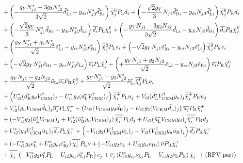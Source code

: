 \documentclass[CheatSheet]{subfiles}
\begin{document}
\begin{align}
\notag\\&+ \left(-\frac{g_Y N_{j1}^*-3g_2 N_{j2}^*}{3\sqrt{2}}\tdL[i]^{*}-\yd[i]N_{j3}^*\tdR[i]^{*}\right){\overline{\neut[j]}\PL d_i}
   +  \left(-\frac{ \sqrt2g_Y}{3} N_{j1} \tdR[i]^*-\yd[i]N_{j3}\tdL[i]^* \right){\overline{\neut[j]}\PR d_i}
\notag\\&+ \left(-\frac{ \sqrt2g_Y}{3} N_{j1}^* \tdR[i]-\yd[i]N_{j3}^*\tdL[i] \right){\overline{d_i}\PL \neut[j]}
   + \left(-\frac{g_Y N_{j1}-3g_2 N_{j2}}{3\sqrt{2}}\tdL[i]-\yd[i]N_{j3}\tdR[i]\right){\overline{d_i}\PR \neut[j]}
\notag\\&+ \left(\frac{g_Y N_{j1}^*+ g_2 N_{j2}^*}{ \sqrt{2}}\teL[i]^{*}-\ye[i]N_{j3}^*\teR[i]^{*}\right){\overline{\neut[j]}\PL e_i}
   +  \left(-\sqrt{2}       g_Y   N_{j1} \teR[i]^*-\ye[i]N_{j3}\teL[i]^* \right){\overline{\neut[j]}\PR e_i}
\notag\\&+ \left(-\sqrt{2}       g_Y   N_{j1}^*\teR[i]-\ye[i]N_{j3}^*\teL[i] \right){\overline{e_i}\PL \neut[j]}
   +  \left(+\frac{g_Y N_{j1}+ g_2 N_{j2}}{ \sqrt{2}}\teL[i]-\ye[i]N_{j3}\teR[i]\right){\overline{e_i}\PR\neut[j]}
\notag\\&+ \frac{g_Y N_{j1}  -g_2 N_{j2}}  {\sqrt{2}}\tnuL[i]\overline{\nu_i}\PR\neut[j]
   +  \frac{g_Y N_{j1}^*-g_2 N_{j2}^*}{\sqrt{2}}\tnuL[i]^{*}{\overline{\neut[j]}\PL \nu_i}
\notag\\&+ \left(U_{i2}^* (\tdR^{*}\yd V\w{CKM}^\dagger)_j - U_{i1}^* g_2 (\tdL^{*}V\w{CKM}^\dagger)_j \right)\overline{\charP[i]}\PL u_j
   + V_{i2} (\tdL^*V\w{CKM}^\dagger\yu)_j  \overline{\charP[i]}\PR u_j
\notag\\&+ V_{i2}^* (\yu V\w{CKM}\tdL)_j             \overline{u_j}\PL\charP[i]
   + \left(U_{i2} (V\w{CKM}\yd\tdR)_j - U_{i1} g_2 (V\w{CKM}\tdL)_j \right)\overline{u_j}\PR \charP[i]
\notag\\&+\left(- V_{i1}^* g_2 (\tuL^{*}V\w{CKM})_j + V_{i2}^* (\tuR^{*}\yu V\w{CKM})_j \right) \overline{\charM[i]}\PL d_j
   + U_{i2} (\tuL^*V\w{CKM}\yd)_j          \overline{\charM[i]}\PR d_j
\notag\\&+ U_{i2}^* (\yd V\w{CKM}^\dagger \tuL)_j    \overline{d_j}\PL\charM[i]
   +\left(- V_{i1} g_2 (V\w{CKM}^\dagger\tuL)_j + V_{i2} (V\w{CKM}^\dagger \yu \tuR)_j \right) \overline{d_j}\PR\charM[i]
\notag\\&+\left(- U_{i1}^* g_2 \teL^{*}             + U_{i2}^* \ye[i]\teR[i]^{*}        \right) \overline{\charP[i]}\PL \nu
   +\left(- U_{i1} g_2 \teL             + U_{i2} \ye[i]\teR[i]        \right) \overline{\nu}\PR \charP[i]
\notag\\&+ \overline{\charM[i]}\left(- V_{i1}^* g_2 \tnuL^{*}\PL+ U_{i2} \ye[j]\tnuL[j]^*\PR    \right)  e_j
   + \overline{e_j}\left(U_{i2}^* \ye[j]\tnuL[j]    \PL - V_{i1} g_2 \tnuL \PR\right)\charM[i]
+\text{(RPV part)}.
\end{align}
\end{document}
